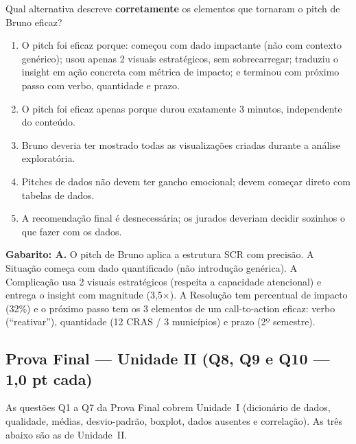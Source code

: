 \begin{SolvedBox}[title=Questão 5 --- Prova II Unidade (2{,}0 pts) --- Pitch de 3 Minutos]
Qual alternativa descreve \textbf{corretamente} os elementos que tornaram o pitch de Bruno eficaz?
\begin{enumerate}[label=\Alph*)]
  \item O pitch foi eficaz porque: começou com dado impactante (não com contexto genérico); usou apenas 2 visuais estratégicos, sem sobrecarregar; traduziu o insight em ação concreta com métrica de impacto; e terminou com próximo passo com verbo, quantidade e prazo.
  \item O pitch foi eficaz apenas porque durou exatamente 3 minutos, independente do conteúdo.
  \item Bruno deveria ter mostrado todas as visualizações criadas durante a análise exploratória.
  \item Pitches de dados não devem ter gancho emocional; devem começar direto com tabelas de dados.
  \item A recomendação final é desnecessária; os jurados deveriam decidir sozinhos o que fazer com os dados.
\end{enumerate}
\end{SolvedBox}

\textbf{Gabarito: A.} O pitch de Bruno aplica a estrutura SCR com precisão. A Situação começa com dado quantificado (não introdução genérica). A Complicação usa 2 visuais estratégicos (respeita a capacidade atencional) e entrega o insight com magnitude (3,5$\times$). A Resolução tem percentual de impacto (32\%) e o próximo passo tem os 3 elementos de um call-to-action eficaz: verbo (``reativar''), quantidade (12 CRAS / 3 municípios) e prazo (2º semestre).

\subsection*{Prova Final --- Unidade II (Q8, Q9 e Q10 --- 1,0 pt cada)}

As questões Q1 a Q7 da Prova Final cobrem Unidade~I (dicionário de dados, qualidade, médias, desvio-padrão, boxplot, dados ausentes e correlação). As três abaixo são as de Unidade~II.

